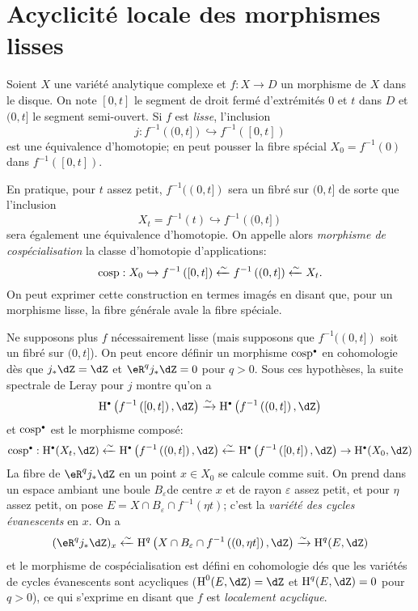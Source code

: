 \section{Acyclicité locale des morphismes lisses}\label{I:5}

Soient $X$ une variété analytique complexe et $f:X\to D$ un morphisme de 
$X$ dans le disque. On note $[0,t]$ le segment de droit fermé d'extrémités 
$0$ et $t$ dans $D$ et $(0,t]$ le segment semi-ouvert. Si $f$ est \emph{lisse}, 
l'inclusion 
\[
  j : f^{-1}\left((0,t]\right) \hookrightarrow f^{-1}\left([0,t]\right)
\]
est une équivalence d'homotopie; en peut pousser la fibre spécial 
$X_0=f^{-1}(0)$ dans $f^{-1}([0,t])$. 

En pratique, pour $t$ assez petit, $f^{-1}((0,t])$ sera un fibré sur 
$(0,t]$ de sorte que l'inclusion 
\[
  X_t = f^{-1}(t) \hookrightarrow f^{-1}\left((0,t]\right)
\]
sera également une équivalence d'homotopie. On appelle alors \emph{morphisme 
de cospécialisation} la classe d'homotopie d'applications: 
\[
  \operatorname{cosp} : X_0 \hookrightarrow f^{-1}\left([0,t]\right) \xleftarrow\sim f^{-1}\left((0,t]\right) \xleftarrow\sim X_t \text{.}
\]
On peut exprimer cette construction en termes imagés en disant que, pour un 
morphisme lisse, la fibre générale avale la fibre spéciale. 

Ne supposons plus $f$ nécessairement lisse (mais supposons que $f^{-1}((0,t])$ 
soit un fibré sur $(0,t]$). On peut encore définir un morphisme 
$\cosp^\bullet$ en cohomologie dès que $j_* \dZ=\dZ$ et 
$\eR^q j_* \dZ = 0$ pour $q>0$. Sous ces hypothèses, la suite spectrale de 
Leray pour $j$ montre qu'on a 
\[
  \h^\bullet\left(f^{-1}\left([0,t]\right),\dZ\right) \iso \h^\bullet\left(f^{-1}\left((0,t]\right),\dZ\right)
\]
et $\cosp^\bullet$ est le morphisme composé: 
\[
  \cosp^\bullet : \h^\bullet(X_t,\dZ)
    \xleftarrow\sim \h^\bullet\left(f^{-1}\left((0,t]\right),\dZ\right) 
    \xleftarrow\sim \h^\bullet\left(f^{-1}\left([0,t]\right),\dZ\right) 
    \to \h^\bullet(X_0,\dZ)
\]
La fibre de $\eR^q j_* \dZ$ en un point $x\in X_0$ se calcule comme suit. On 
prend dans un espace ambiant une boule $B_\varepsilon$de centre $x$ et de rayon 
$\varepsilon$ assez petit, et pour $\eta$ assez petit, on pose 
$E=X\cap B_\varepsilon \cap f^{-1}(\eta t)$; c'est la \emph{variété des 
cycles évanescents} en $x$. On a 
\[
  (\eR^q j_* \dZ)_x \xleftarrow\sim \h^q\left(X\cap B_\varepsilon\cap f^{-1}\left((0,\eta t]\right),\dZ\right) \xrightarrow\sim \h^q(E,\dZ)
\]
et le morphisme de cospécialisation est défini en cohomologie dés que les 
variétés de cycles évanescents sont acycliques ($\h^0(E,\dZ)=\dZ$ et 
$\h^q(E,\dZ) = 0$ pour $q>0$), ce qui s'exprime en disant que $f$ est 
\emph{localement acyclique}. 

